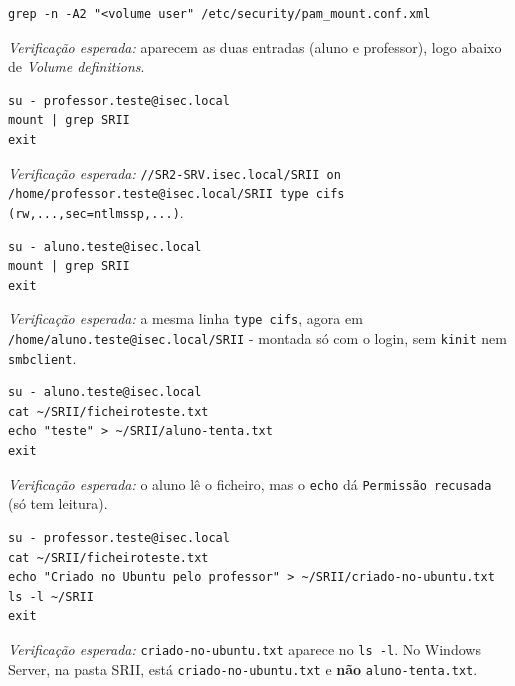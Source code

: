 \begin{lstlisting}[style=bashstyle]
grep -n -A2 "<volume user" /etc/security/pam_mount.conf.xml
\end{lstlisting}

\emph{Verificação esperada:} aparecem as duas entradas (aluno e professor), logo abaixo de \emph{Volume definitions}.


\begin{lstlisting}[style=bashstyle]
su - professor.teste@isec.local
mount | grep SRII
exit
\end{lstlisting}

\emph{Verificação esperada:} \texttt{/\allowbreak{}/\allowbreak{}SR2-SRV.isec.local/\allowbreak{}SRII on /\allowbreak{}home/\allowbreak{}professor.teste@isec.local/\allowbreak{}SRII type cifs (rw,\allowbreak{}...,\allowbreak{}sec=ntlmssp,\allowbreak{}...)}.


\begin{lstlisting}[style=bashstyle]
su - aluno.teste@isec.local
mount | grep SRII
exit
\end{lstlisting}

\emph{Verificação esperada:} a mesma linha \texttt{type cifs}, agora em \texttt{/\allowbreak{}home/\allowbreak{}aluno.teste@isec.local/\allowbreak{}SRII} - montada só com o login, sem \texttt{kinit} nem \texttt{smbclient}.


\begin{lstlisting}[style=bashstyle]
su - aluno.teste@isec.local
cat ~/SRII/ficheiroteste.txt
echo "teste" > ~/SRII/aluno-tenta.txt
exit
\end{lstlisting}

\emph{Verificação esperada:} o aluno lê o ficheiro, mas o \texttt{echo} dá \texttt{Permissão recusada} (só tem leitura).


\begin{lstlisting}[style=bashstyle]
su - professor.teste@isec.local
cat ~/SRII/ficheiroteste.txt
echo "Criado no Ubuntu pelo professor" > ~/SRII/criado-no-ubuntu.txt
ls -l ~/SRII
exit
\end{lstlisting}

\emph{Verificação esperada:} \texttt{criado-no-ubuntu.txt} aparece no \texttt{ls -l}. No Windows Server, na pasta SRII, está \texttt{criado-no-ubuntu.txt} e \textbf{não} \texttt{aluno-tenta.txt}.

